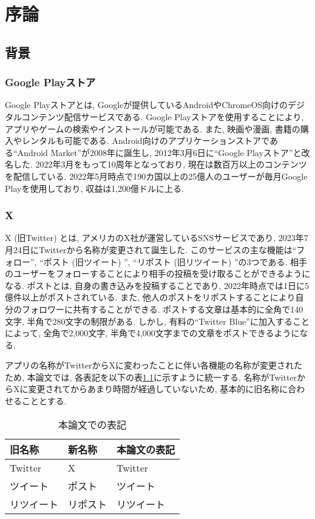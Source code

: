 \chapter{序論}
\label{chap:jyoron}

\section{背景}

\subsection{Google Playストア}
Google Playストア\cite{google-play-store}とは, Googleが提供しているAndroidやChromeOS向けのデジタルコンテンツ配信サービスである. Google Playストアを使用することにより, アプリやゲームの検索やインストールが可能である. また, 映画や漫画, 書籍の購入やレンタルも可能である. 
Android向けのアプリケーションストアである``Android Market''が2008年に誕生し, 2012年3月6日に``Google Playストア''と改名した. 2022年3月をもって10周年となっており, 現在は数百万以上のコンテンツを配信している\cite{about-google-play}. 
2022年5月時点で190カ国以上の25億人のユーザーが毎月Google Playを使用しており, 収益は1,200億ドルに上る\cite{purnima-kochikar}. 

\subsection{X}
X (旧Twitter) \cite{twitter}とは, アメリカのX社が運営しているSNSサービスであり, 2023年7月24日にTwitterから名称が変更されて誕生した. 
このサービスの主な機能は``フォロー'', ``ポスト (旧ツイート) '', ``リポスト (旧リツイート) ''の3つである. 相手のユーザーをフォローすることにより相手の投稿を受け取ることができるようになる. ポストとは, 自身の書き込みを投稿することであり, 2022年時点では1日に5億件以上がポストされている\cite{aboutx}. また, 他人のポストをリポストすることにより自分のフォロワーに共有することができる. 
ポストする文章は基本的に全角で140文字, 半角で280文字の制限がある. しかし, 有料の``Twitter Blue''に加入することによって, 全角で2,000文字, 半角で4,000文字までの文章をポストできるようになる. 

アプリの名称がTwitterからXに変わったことに伴い各機能の名称が変更されたため, 本論文では, 各表記を以下の表\ref{tb:twitter}に示すように統一する. 名称がTwitterからXに変更されてからあまり時間が経過していないため, 基本的に旧名称に合わせることとする. 

\begin{table}[H]
  \caption{本論文での表記}
  \label{tb:twitter}
  \begin{center}
  \begin{tabularx}{\linewidth}{X|X|X}
    \hline
    旧名称&新名称&本論文の表記\\\hline\hline
    Twitter&X&Twitter\\\hline
    ツイート&ポスト&ツイート\\\hline
    リツイート&リポスト&リツイート\\\hline
  \end{tabularx}\end{center}
\end{table}

